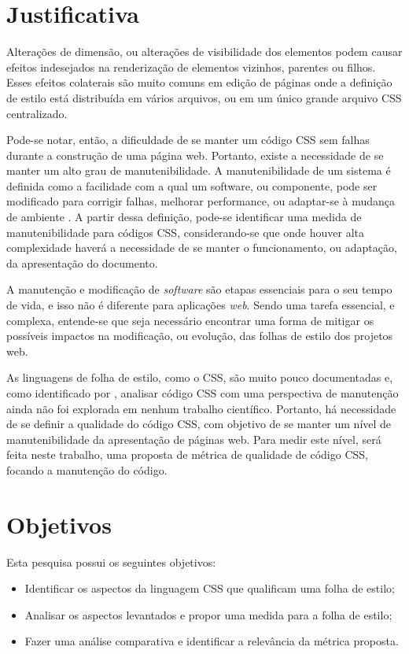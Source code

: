 \section{Justificativa}

Alterações de dimensão, ou alterações de visibilidade dos elementos podem causar efeitos indesejados na renderização de elementos vizinhos, parentes ou filhos. Esses efeitos colaterais são muito comuns em edição de páginas onde a definição de estilo está distribuída em vários arquivos, ou em um único grande arquivo CSS centralizado.

Pode-se notar, então, a dificuldade de se manter um código CSS sem falhas durante a construção de uma página web. Portanto, existe a necessidade de se manter um alto grau de manutenibilidade. A manutenibilidade de um sistema é definida como a facilidade com a qual um software, ou componente, pode ser modificado para corrigir falhas, melhorar performance, ou adaptar-se à mudança de ambiente \cite{Ieee1990}. A partir dessa definição, pode-se identificar uma medida de manutenibilidade para códigos CSS, considerando-se que onde houver alta complexidade haverá a necessidade de se manter o funcionamento, ou adaptação, da apresentação do documento.

A manutenção e modificação de \textit{software} são etapas essenciais para o seu tempo de vida, e isso não é diferente para aplicações \textit{web}. Sendo uma tarefa essencial, e complexa, entende-se que seja necessário encontrar uma forma de mitigar os possíveis impactos na modificação, ou evolução, das folhas de estilo dos projetos web.

As linguagens de folha de estilo, como o CSS, são muito pouco documentadas \cite{Marden1999,Quint2007,Geneves2012} e, como identificado por , analisar código CSS com uma perspectiva de manutenção ainda não foi explorada em nenhum trabalho científico. Portanto, há necessidade de se definir a qualidade do código CSS, com objetivo de se manter um nível de manutenibilidade da apresentação de páginas web. Para medir este nível, será feita neste trabalho, uma proposta de métrica de qualidade de código CSS, focando a manutenção do código.

\section{Objetivos}
Esta pesquisa possui os seguintes objetivos:

\begin{itemize}
	\item Identificar os aspectos da linguagem CSS que qualificam uma folha de estilo;
	\item Analisar os aspectos levantados e propor uma medida para a folha de estilo;
	\item Fazer uma análise comparativa e identificar a relevância da métrica proposta.
\end{itemize}

